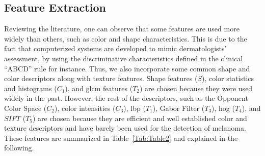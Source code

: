 
\subsection{Feature Extraction}\label{chp3-subsec3}
Reviewing the literature, one can observe that some features are used more widely than others, such as color and shape characteristics. 
This is due to the fact that computerized systems are developed to mimic dermatologists' assessment, by using the discriminative characteristics defined in the clinical ``ABCD'' rule for instance.
Thus, we also incorporate some common shape and color descriptors along with texture features.
Shape features ($S$), color statistics and histograms ($C_{1}$), and \ac{glcm} features ($T_{2}$) are chosen because they were used widely in the past.
However, the rest of the descriptors, such as the Opponent Color Space ($C_{2}$), color intensities ($C_{3}$), \ac{lbp} ($T_{1}$), Gabor Filter ($T_{3}$), \ac{hog} ($T_{4}$), and $SIFT$ ($T_{5}$) are chosen because they are efficient and well established color and texture descriptors and have barely been used for the detection of melanoma.
These features are summarized in Table~\ref{Tab:Table2} and explained in the following.

